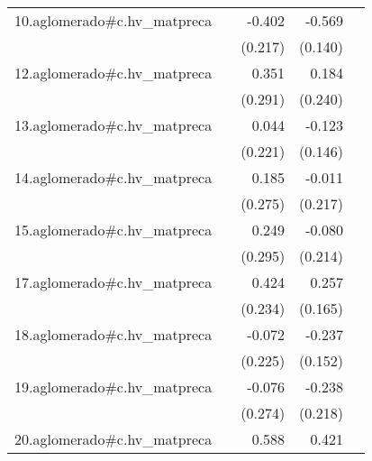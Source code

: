 {\begin{longtable}{l*{4}{D{.}{.}{-1}}}
\addlinespace
10.aglomerado#c.hv\_matpreca&                     &      -0.402         &      -0.569\sym{***}&                     \\
            &                     &     (0.217)         &     (0.140)         &                     \\
\addlinespace
12.aglomerado#c.hv\_matpreca&                     &       0.351         &       0.184         &                     \\
            &                     &     (0.291)         &     (0.240)         &                     \\
\addlinespace
13.aglomerado#c.hv\_matpreca&                     &       0.044         &      -0.123         &                     \\
            &                     &     (0.221)         &     (0.146)         &                     \\
\addlinespace
14.aglomerado#c.hv\_matpreca&                     &       0.185         &      -0.011         &                     \\
            &                     &     (0.275)         &     (0.217)         &                     \\
\addlinespace
15.aglomerado#c.hv\_matpreca&                     &       0.249         &      -0.080         &                     \\
            &                     &     (0.295)         &     (0.214)         &                     \\
\addlinespace
17.aglomerado#c.hv\_matpreca&                     &       0.424         &       0.257         &                     \\
            &                     &     (0.234)         &     (0.165)         &                     \\
\addlinespace
18.aglomerado#c.hv\_matpreca&                     &      -0.072         &      -0.237         &                     \\
            &                     &     (0.225)         &     (0.152)         &                     \\
\addlinespace
19.aglomerado#c.hv\_matpreca&                     &      -0.076         &      -0.238         &                     \\
            &                     &     (0.274)         &     (0.218)         &                     \\
\addlinespace
20.aglomerado#c.hv\_matpreca&                     &       0.588         &       0.421         &                     \\

\end{longtable}}
